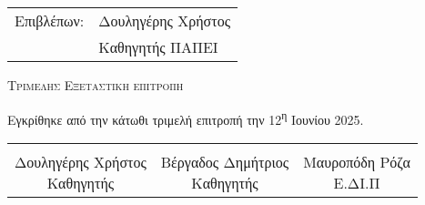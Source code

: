            \begin{center}
	
	       
    \end{center}
    
    \begin{tabular}{ll}
		Επιβλέπων: & Δουληγέρης Χρήστος \\
		 & Καθηγητής ΠΑΠΕΙ
	\end{tabular}
	\vspace{10.5cm}
    \begin{center}
    \Large
    \textsc{Τριμελης Εξεταστικη επιτροπη }
    \end{center}




    
	
	\vspace{1.5cm}
    
    Εγκρίθηκε από την κάτωθι τριμελή επιτροπή την 12\textsuperscript{η} Ιουνίου 2025.
    
    \vspace{1.5cm}
	
	\begin{center}
	\noindent\begin{tabular}{ccc}
		\makebox[0.3\textwidth]{\hrulefill} & 
		\makebox[0.3\textwidth]{\hrulefill} & 
		\makebox[0.3\textwidth]{\hrulefill} \\

		\specialcell{Δουληγέρης Χρήστος \\ Καθηγητής} & 
		\specialcell{Βέργαδος Δημήτριος \\ Καθηγητής} & 
		\specialcell{Μαυροπόδη Ρόζα \\ Ε.ΔΙ.Π} \\ [8ex]%
	\end{tabular}
	\end{center}